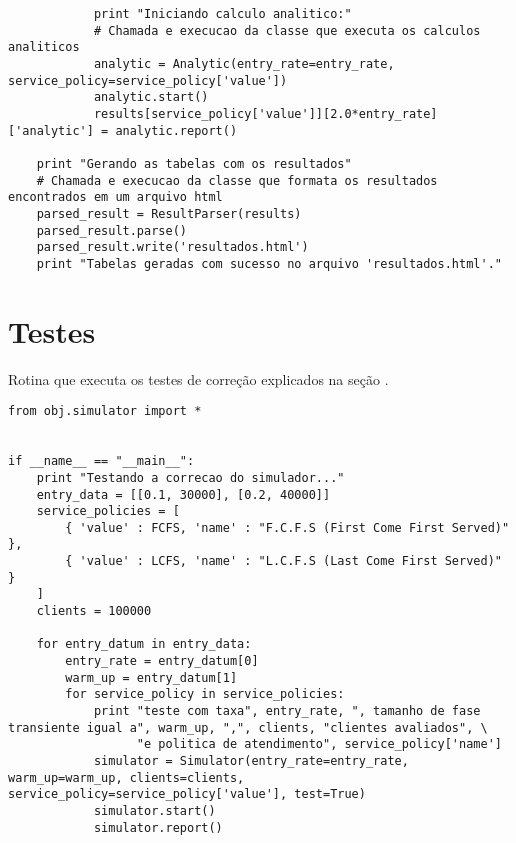 \begin{lstlisting}
            print "Iniciando calculo analitico:"
            # Chamada e execucao da classe que executa os calculos analiticos
            analytic = Analytic(entry_rate=entry_rate, service_policy=service_policy['value'])
            analytic.start()
            results[service_policy['value']][2.0*entry_rate]['analytic'] = analytic.report()

    print "Gerando as tabelas com os resultados"
    # Chamada e execucao da classe que formata os resultados encontrados em um arquivo html
    parsed_result = ResultParser(results)
    parsed_result.parse()
    parsed_result.write('resultados.html')
    print "Tabelas geradas com sucesso no arquivo 'resultados.html'."
\end{lstlisting}

\section{Testes}
\label{sec:codteste}
Rotina que executa os testes de correção explicados na seção \label{sec:teste}.

\begin{lstlisting}
from obj.simulator import *


if __name__ == "__main__":
    print "Testando a correcao do simulador..."
    entry_data = [[0.1, 30000], [0.2, 40000]]
    service_policies = [
        { 'value' : FCFS, 'name' : "F.C.F.S (First Come First Served)" },
        { 'value' : LCFS, 'name' : "L.C.F.S (Last Come First Served)"  }
    ]
    clients = 100000
    
    for entry_datum in entry_data:
        entry_rate = entry_datum[0]
        warm_up = entry_datum[1]
        for service_policy in service_policies:
            print "teste com taxa", entry_rate, ", tamanho de fase transiente igual a", warm_up, ",", clients, "clientes avaliados", \
                  "e politica de atendimento", service_policy['name']
            simulator = Simulator(entry_rate=entry_rate, warm_up=warm_up, clients=clients, service_policy=service_policy['value'], test=True)
            simulator.start()
            simulator.report()
\end{lstlisting}
